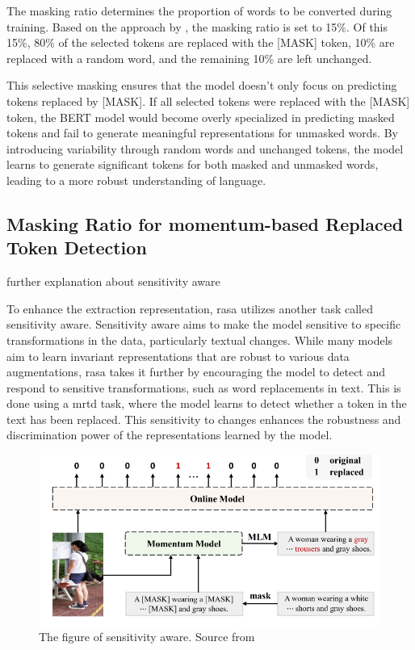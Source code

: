 The masking ratio determines the proportion of words to be converted during training. Based on the approach by \cite{devlin2018bert}, the masking ratio is set to 15\%. Of this 15\%, 80\% of the selected tokens are replaced with the [MASK] token, 10\% are replaced with a random word, and the remaining 10\% are left unchanged.

This selective masking ensures that the model doesn't only focus on predicting tokens replaced by [MASK]. If all selected tokens were replaced with the [MASK] token, the BERT model would become overly specialized in predicting masked tokens and fail to generate meaningful representations for unmasked words. By introducing variability through random words and unchanged tokens, the model learns to generate significant tokens for both masked and unmasked words, leading to a more robust understanding of language.


\subsection{Masking Ratio for momentum-based Replaced Token Detection}
{\color{red}further explanation about sensitivity aware}

To enhance the extraction representation, \acrshort{rasa} utilizes another task called sensitivity aware. Sensitivity aware aims to make the model sensitive to specific transformations in the data, particularly textual changes. While many models aim to learn invariant representations that are robust to various data augmentations, \acrshort{rasa} takes it further by encouraging the model to detect and respond to sensitive transformations, such as word replacements in text. This is done using a \acrshort{mrtd} task, where the model learns to detect whether a token in the text has been replaced. This sensitivity to changes enhances the robustness and discrimination power of the representations learned by the model.

\begin{figure}[htbp]
  \includegraphics[width=\linewidth]{img/rasa_sensitivity_aware.png}
  \caption{The figure of sensitivity aware. Source from \cite{Bai2023RaSaRA} }
  \label{img:rasa_sa}
\end{figure}


